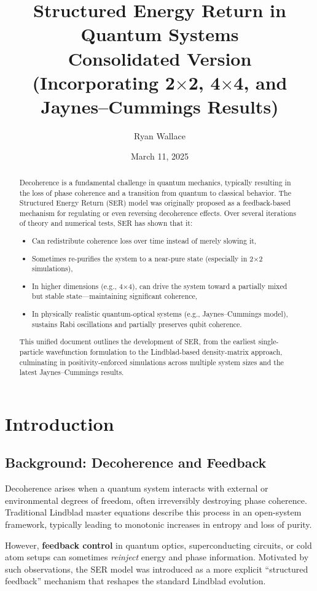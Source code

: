 \documentclass[12pt]{article}
\title{\textbf{Structured Energy Return in Quantum Systems}\\
\large{Consolidated Version (Incorporating 2$\times$2, 4$\times$4, and Jaynes--Cummings Results)}}
\author{Ryan Wallace}
\date{March 11, 2025}
\begin{document}
\maketitle

\begin{abstract}
Decoherence is a fundamental challenge in quantum mechanics, typically resulting in the loss of phase coherence and a transition from quantum to classical behavior. The Structured Energy Return (SER) model was originally proposed as a feedback-based mechanism for regulating or even reversing decoherence effects. Over several iterations of theory and numerical tests, SER has shown that it:
\begin{itemize}
\item Can redistribute coherence loss over time instead of merely slowing it,
\item Sometimes re-purifies the system to a near-pure state (especially in 2$\times$2 simulations),
\item In higher dimensions (e.g., 4$\times$4), can drive the system toward a partially mixed but stable state---maintaining significant coherence,
\item In physically realistic quantum-optical systems (e.g., Jaynes--Cummings model), sustains Rabi oscillations and partially preserves qubit coherence.
\end{itemize}
This unified document outlines the development of SER, from the earliest single-particle wavefunction formulation to the Lindblad-based density-matrix approach, culminating in positivity-enforced simulations across multiple system sizes and the latest Jaynes--Cummings results.
\end{abstract}

\section{Introduction}

\subsection{Background: Decoherence and Feedback}
Decoherence arises when a quantum system interacts with external or environmental degrees of freedom, often irreversibly destroying phase coherence. Traditional Lindblad master equations describe this process in an open-system framework, typically leading to monotonic increases in entropy and loss of purity.

However, \textbf{feedback control} in quantum optics, superconducting circuits, or cold atom setups can sometimes \emph{reinject} energy and phase information. Motivated by such observations, the SER model was introduced as a more explicit ``structured feedback'' mechanism that reshapes the standard Lindblad evolution.
\end{document}

